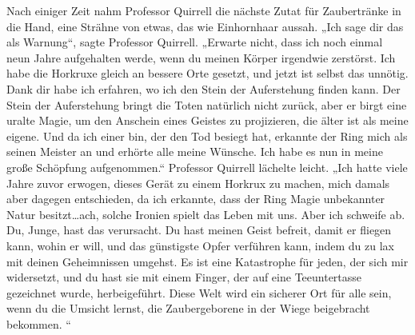 Nach einiger Zeit nahm Professor Quirrell die nächste Zutat für Zaubertränke in die Hand, eine Strähne von etwas, das wie Einhornhaar aussah.
„Ich sage dir das als Warnung“, sagte Professor Quirrell. „Erwarte nicht, dass ich noch einmal neun Jahre aufgehalten werde, wenn du meinen Körper irgendwie zerstörst. Ich habe die Horkruxe gleich an bessere Orte gesetzt, und jetzt ist selbst das unnötig. Dank dir habe ich erfahren, wo ich den Stein der Auferstehung finden kann. Der Stein der Auferstehung bringt die Toten natürlich nicht zurück, aber er birgt eine uralte Magie, um den Anschein eines Geistes zu projizieren, die älter ist als meine eigene. Und da ich einer bin, der den Tod besiegt hat, erkannte der Ring mich als seinen Meister an und erhörte alle meine Wünsche. Ich habe es nun in meine große Schöpfung aufgenommen.“
Professor Quirrell lächelte leicht.
„Ich hatte viele Jahre zuvor erwogen, dieses Gerät zu einem Horkrux zu machen, mich damals aber dagegen entschieden, da ich erkannte, dass der Ring Magie unbekannter Natur besitzt…ach, solche Ironien spielt das Leben mit uns. Aber ich schweife ab. Du, Junge, hast das verursacht. Du hast meinen Geist befreit, damit er fliegen kann, wohin er will, und das günstigste Opfer verführen kann, indem du zu lax mit deinen Geheimnissen umgehst. Es ist eine Katastrophe für jeden, der sich mir widersetzt, und du hast sie mit einem Finger, der auf eine Teeuntertasse gezeichnet wurde, herbeigeführt. Diese Welt wird ein sicherer Ort für alle sein, wenn du die Umsicht lernst, die Zaubergeborene in der Wiege beigebracht bekommen. “

